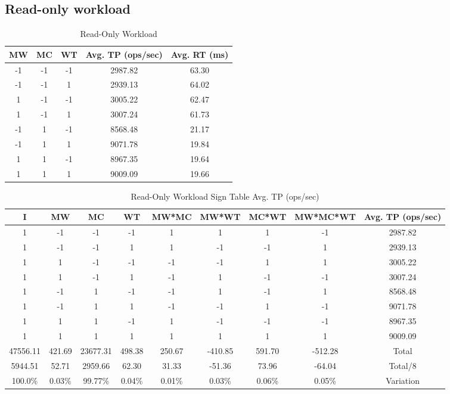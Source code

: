 \documentclass[11pt,a4paper]{article}
\begin{document}
\subsection{Read-only workload}
%
\begin{table}[H]
\centering
\scriptsize{
\begin{tabular}{|c|c|c|c|c|}
\hline MW & MC & WT & Avg. TP (ops/sec) & Avg. RT (ms)\\
\hline
-1 & -1 & -1 & 2987.82 & 63.30\\
\hline
-1 & -1 & 1 & 2939.13 & 64.02\\
\hline
1 & -1 & -1 & 3005.22 & 62.47\\
\hline
1 & -1 & 1 & 3007.24 & 61.73\\
\hline
-1 & 1 & -1 & 8568.48 & 21.17\\
\hline
-1 & 1 & 1 & 9071.78 & 19.84\\
\hline
1 & 1 & -1 & 8967.35 & 19.64\\
\hline
1 & 1 & 1 & 9009.09 & 19.66\\
\hline
\end{tabular}
}
\caption{Read-Only Workload}
\end{table}
%
\begin{table}[H]
\centering
\scriptsize{
\begin{tabular}{|c|ccccccc|c|}
\hline I & MW & MC & WT & MW*MC & MW*WT & MC*WT & MW*MC*WT & Avg. TP (ops/sec)\\
\hline
1 & -1 & -1 & -1 & 1 & 1 & 1 & -1 & 2987.82\\
1 & -1 & -1 & 1 & 1 & -1 & -1 & 1 & 2939.13\\
1 & 1 & -1 & -1 & -1 & -1 & 1 & 1 & 3005.22\\
1 & 1 & -1 & 1 & -1 & 1 & -1 & -1 & 3007.24\\
1 & -1 & 1 & -1 & -1 & 1 & -1 & 1 & 8568.48\\
1 & -1 & 1 & 1 & -1 & -1 & 1 & -1 & 9071.78\\
1 & 1 & 1 & -1 & 1 & -1 & -1 & -1 & 8967.35\\
1 & 1 & 1 & 1 & 1 & 1 & 1 & 1 & 9009.09\\
\hline
47556.11 & 421.69 & 23677.31 & 498.38 & 250.67 & -410.85 & 591.70 & -512.28 & Total\\
5944.51 & 52.71 & 2959.66 & 62.30 & 31.33 & -51.36 & 73.96 & -64.04 & Total/8\\
100.0\% & 0.03\% & 99.77\% & 0.04\% & 0.01\% & 0.03\% & 0.06\% & 0.05\% & Variation\\
\hline
\end{tabular}
}
\caption{Read-Only Workload Sign Table Avg. TP (ops/sec)}
\label{2k_get_tp}
\end{table}
\end{document}
